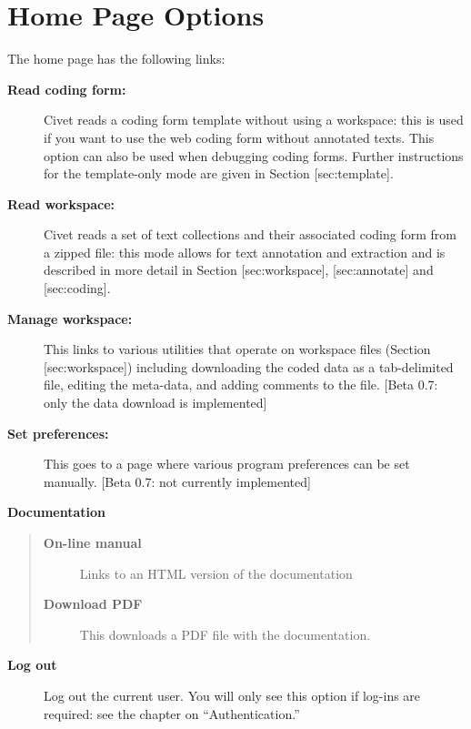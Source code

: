 \documentclass[letterpaper,10pt,english]{sphinxmanual}
\begin{document}
\chapter{Home Page Options}
\label{homepage:home-page-options}\label{homepage::doc}
The home page has the following links:
\begin{description}
\item[{\textbf{Read coding form:}}] \leavevmode
Civet reads a coding form template without using a workspace: this
is used if you want to use the web coding form without annotated
texts. This option can also be used when debugging coding forms.
Further instructions for the template-only mode are given in Section
{[}sec:template{]}.

\item[{\textbf{Read workspace:}}] \leavevmode
Civet reads a set of text collections and their associated coding
form from a zipped file: this mode allows for text annotation and
extraction and is described in more detail in Section
{[}sec:workspace{]}, {[}sec:annotate{]} and {[}sec:coding{]}.

\item[{\textbf{Manage workspace:}}] \leavevmode
This links to various utilities that operate on workspace files
(Section {[}sec:workspace{]}) including downloading the coded data as a
tab-delimited file, editing the meta-data, and adding comments to
the file. {[}Beta 0.7: only the data download is implemented{]}

\item[{\textbf{Set preferences:}}] \leavevmode
This goes to a page where various program preferences can be set
manually. {[}Beta 0.7: not currently implemented{]}

\end{description}

\textbf{Documentation}
\begin{quote}
\begin{description}
\item[{\textbf{On-line manual}}] \leavevmode
Links to an HTML version of the documentation

\item[{\textbf{Download PDF}}] \leavevmode
This downloads a PDF file with the documentation.

\end{description}
\end{quote}
\begin{description}
\item[{\textbf{Log out}}] \leavevmode
Log out the current user. You will only see this option if log-ins
are required: see the chapter on “Authentication.”

\end{description}
\end{document}

